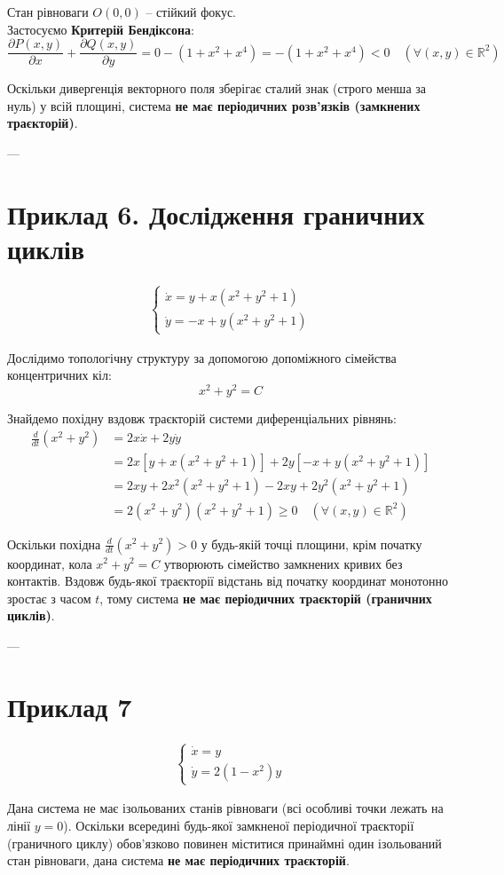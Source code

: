 \documentclass[11pt, a4paper]{article}
\begin{document}
Стан рівноваги $O(0,0)$ -- стійкий фокус. \\
Застосуємо \textbf{Критерій Бендіксона}:
$$\frac{\partial P(x,y)}{\partial x} + \frac{\partial Q(x,y)}{\partial y} = 0 - (1 + x^2 + x^4) = -(1 + x^2 + x^4) < 0 \quad (\forall (x,y) \in \mathbb{R}^2)$$

Оскільки дивергенція векторного поля зберігає сталий знак (строго менша за нуль) у всій площині, система \textbf{не має періодичних розв'язків (замкнених траєкторій)}.

---

\section*{Приклад 6. Дослідження граничних циклів}
\begin{gather*}
\begin{cases}
\dot{x} = y + x(x^2 + y^2 + 1) \\
\dot{y} = -x + y(x^2 + y^2 + 1)
\end{cases}
\end{gather*}

Дослідимо топологічну структуру за допомогою допоміжного сімейства концентричних кіл:
$$x^2 + y^2 = C$$

Знайдемо похідну вздовж траєкторій системи диференціальних рівнянь:
\begin{align*}
\frac{d}{dt}(x^2 + y^2) &= 2x\dot{x} + 2y\dot{y} \\
&= 2x[y + x(x^2 + y^2 + 1)] + 2y[-x + y(x^2 + y^2 + 1)] \\
&= 2xy + 2x^2(x^2 + y^2 + 1) - 2xy + 2y^2(x^2 + y^2 + 1) \\
&= 2(x^2 + y^2)(x^2 + y^2 + 1) \ge 0 \quad (\forall (x,y) \in \mathbb{R}^2)
\end{align*}

Оскільки похідна $\frac{d}{dt}(x^2+y^2) > 0$ у будь-якій точці площини, крім початку координат, кола $x^2 + y^2 = C$ утворюють сімейство замкнених кривих без контактів. Вздовж будь-якої траєкторії відстань від початку координат монотонно зростає з часом $t$, тому система \textbf{не має періодичних траєкторій (граничних циклів)}.

---

\section*{Приклад 7}
\begin{gather*}
\begin{cases}
\dot{x} = y \\
\dot{y} = 2(1 - x^2)y
\end{cases}
\end{gather*}

Дана система не має ізольованих станів рівноваги (всі особливі точки лежать на лінії $y=0$). Оскільки всередині будь-якої замкненої періодичної траєкторії (граничного циклу) обов'язково повинен міститися принаймні один ізольований стан рівноваги, дана система \textbf{не має періодичних траєкторій}.
\end{document}
